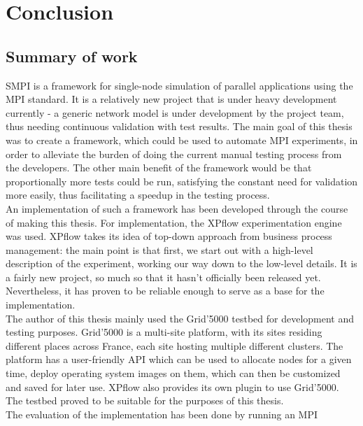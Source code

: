 




\chapter{Conclusion}
\label{Chapter6}

\section{Summary of work}
SMPI is a framework for single-node simulation of parallel
applications using the MPI standard. It is a relatively new project
that is under heavy
development currently - a generic network model is under development by
the project team, thus needing continuous validation with test
results. The main goal of this thesis was to create a framework, which
could be used to automate MPI experiments, in order to alleviate the
burden of doing the current manual testing process from the
developers. The other main benefit of the framework would be that
proportionally more tests could be run, satisfying the constant need
for validation more easily, thus facilitating a speedup in the testing
process.\\
An implementation of such a framework has been developed through the
course of making this thesis. For implementation, the XPflow
experimentation engine was used. XPflow takes its idea of top-down
approach from business process management: the main point is that
first, we start out with a high-level description of the experiment,
working our way down to the low-level details. It is a fairly new
project, so much so that it hasn't officially been released
yet. Nevertheless, it has proven to be reliable enough to serve as a
base for the implementation.\\
The author of this thesis mainly used the Grid'5000 testbed for
development and testing purposes. Grid'5000 is a multi-site platform,
with its sites residing different places across France, each site
hosting multiple different clusters. The platform has a user-friendly
API which can be used to allocate nodes for a given time, deploy
operating system images on them, which can then be customized and
saved for later use. XPflow also provides its own plugin to use
Grid'5000. The testbed proved to be suitable for the purposes of this
thesis.\\
The evaluation of the implementation has been done by running an MPI
